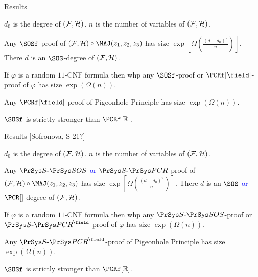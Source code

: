 \begin{frame}{Results}

    $d_0$ is the degree of $(\mathcal{F}, \mathcal{H})$. $n$ is the number of variables of $(\mathcal{F}, \mathcal{H})$.
    
    \begin{theorem}
        Any $\SOSf$-proof of $(\Fs, \Hs) \circ \MAJ(z_1, z_2, z_3)$ has size
        $\exp\left[\Omega\left(\frac{(d - d_0)^2}{n}\right)\right]$. There $d$ is an
        $\SOS$-degree of $(\mathcal{F}, \mathcal{H})$.
    \end{theorem}

    \pause

    \begin{theorem}
        If $\varphi$ is a random $11$-CNF formula then whp any $\SOSf$-proof or $\PCRf[\field]$-proof of
        $\varphi$ has size $\exp(\Omega(n))$.
    \end{theorem}

    \pause
    \begin{theorem}
        Any $\PCRf[\field]$-proof of Pigeonhole Principle has size $\exp(\Omega(n))$.
    \end{theorem}

    $\SOSf$ is strictly stronger than $\PCRf[\mathbb{R}]$.

\end{frame}

\begin{frame}{Results [Sofronova, S 21?]}

    $d_0$ is the degree of $(\mathcal{F}, \mathcal{H})$. $n$ is the number of variables of $(\mathcal{F}, \mathcal{H})$.
    
    \begin{theorem}
        Any \textcolor{blue}{$\SSOS$ or $\SPCR$}-proof of $(\Fs, \Hs) \circ \MAJ(z_1, z_2, z_3)$ has size
        $\exp\left[\Omega\left(\frac{(d - d_0)^2}{n}\right)\right]$. There $d$ is an
        \textcolor{blue}{$\SOS$ or $\PCR[]$}-degree of $(\mathcal{F}, \mathcal{H})$.
    \end{theorem}

    \begin{theorem}
        If $\varphi$ is a random $11$-CNF formula then whp any \textcolor{blue}{$\SSOS$}-proof
        or \textcolor{blue}{$\SPCR^{\field}$}-proof of $\varphi$ has size $\exp(\Omega(n))$.
    \end{theorem}

    \begin{theorem}
        Any \textcolor{blue}{$\SPCR^{\field}$}-proof of Pigeonhole Principle has size $\exp(\Omega(n))$.
    \end{theorem}

    $\SOSf$ is strictly stronger than $\PCRf[\mathbb{R}]$.

\end{frame}